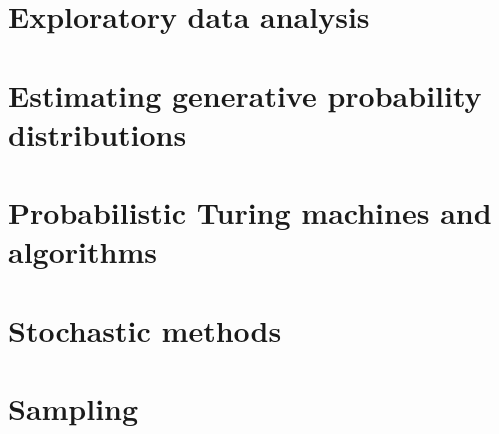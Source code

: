 \documentclass[oneside]{book}
\begin{document}
\part{Exploratory data analysis}







\part{Estimating generative probability distributions}













\part{Probabilistic Turing machines and algorithms}

\part{Stochastic methods}







\part{Sampling}

\end{document}
